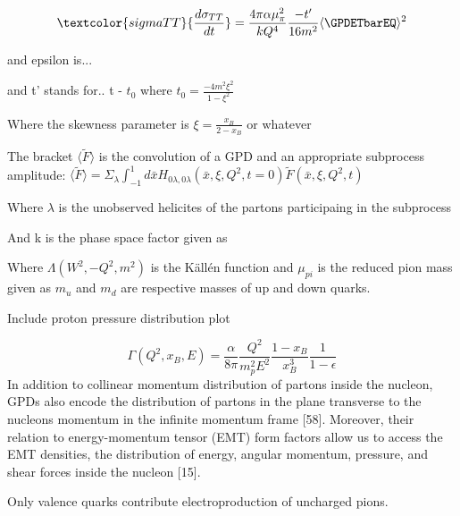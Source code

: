     
    \begin{equation}
        \textcolor{sigmaTT}{\frac{d\sigma_{TT}}{dt}} = 
        \frac{4\pi\alpha \mu_{\pi}^2}{kQ^4}
        \frac{-t'}{16m^2}
        \langle \GPDETbarEQ \rangle^2   
    \end{equation} 
        
    

    and epsilon is... 
    
    and t' stands for.. t - $t_0$ where $t_0 = \frac{-4m^2\xi^2}{1-\xi^2}$
    
    
    Where the skewness parameter is $\xi = \frac{x_B}{2-x_B}$ or whatever
    

    The bracket $\langle \tilde{F} \rangle$ is the convolution of a GPD and an appropriate subprocess amplitude:
    $
    \langle \tilde{F} \rangle =  \Sigma_{\lambda} \int_{-1}^{1} d\bar{x}H_{0\lambda,0\lambda}\left( \bar{x}, \xi, Q^2, t=0  \right)\tilde{F}\left( \bar{x}, \xi, Q^2, t  \right)\   
    $ 


    Where $\lambda$ is the unobserved helicites of the partons participaing in the subprocess
    
    
    
    
    And k is the phase space factor given as 
     \scalebox{0.7}{%
     $           k = 16\pi \left( W^2 -m^2)\sqrt{\Lambda(W^2,-Q^2,m^2)} \right)$ 
    }
    
        Where $\Lambda(W^2,-Q^2,m^2)$ is the Källén function and $\mu_{pi}$ is the reduced pion mass given as 
    $m_u$ and $m_d$ are respective masses of up and down quarks.


        Include proton pressure distribution plot

      

    \begin{equation}
                 \Gamma (Q^2, x_B, E) = \frac{\alpha}{8\pi} \frac{Q^2}{m^2_pE^2}\frac{1-x_B}{x_B^3}\frac{1}{1-\epsilon}
    \end{equation}
In addition to collinear momentum distribution of partons inside the
nucleon, GPDs also encode the distribution of partons in the plane transverse to
the nucleons momentum in the infinite momentum frame [58]. Moreover, their
relation to energy-momentum tensor (EMT) form factors allow us to access the
EMT densities, the distribution of energy, angular momentum, pressure, and shear
forces inside the nucleon [15].

Only valence quarks contribute electroproduction of uncharged pions.


